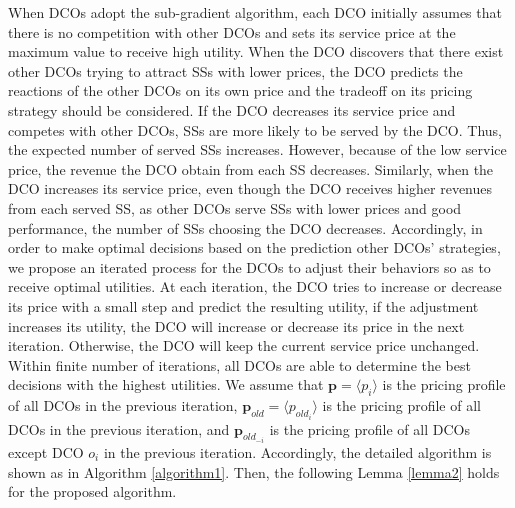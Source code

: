 \documentclass[twocolumn,10pt]{IEEEtran}
\begin{document}
When DCOs adopt the sub-gradient algorithm, each DCO initially assumes that there is no competition with other DCOs and sets its service price at the maximum value to receive high utility. When the DCO discovers that there exist other DCOs trying to attract SSs with lower prices, the DCO predicts the reactions of the other DCOs on its own price and the tradeoff on its pricing strategy should be considered. If the DCO decreases its service price and competes with other DCOs, SSs are more likely to be served by the DCO. Thus, the expected number of served SSs increases. However, because of the low service price, the revenue the DCO obtain from each SS decreases. Similarly, when the DCO increases its service price, even though the DCO receives higher revenues from each served SS, as other DCOs serve SSs with lower prices and good performance, the number of SSs choosing the DCO decreases. Accordingly, in order to make optimal decisions based on the prediction other DCOs' strategies, we propose an iterated process for the DCOs to adjust their behaviors so as to receive optimal utilities. At each iteration, the DCO tries to increase or decrease its price with a small step and predict the resulting utility, if the adjustment increases its utility, the DCO will increase or decrease its price in the next iteration. Otherwise, the DCO will keep the current service price unchanged. Within finite number of iterations, all DCOs are able to determine the best decisions with the highest utilities. We assume that $\mathbf{p}=\langle p_{i} \rangle$ is the pricing profile of all DCOs in the previous iteration, $\mathbf{p}_{old}=\langle {p}_{old_i} \rangle$ is the pricing profile of all DCOs in the previous iteration, and $\mathbf{p}_{old_{-i}}$ is the pricing profile of all DCOs except DCO $o_i$ in the previous iteration. Accordingly, the detailed algorithm is shown as in Algorithm \ref{algorithm1}. Then, the following Lemma \ref{lemma2} holds for the proposed algorithm.
\end{document}
